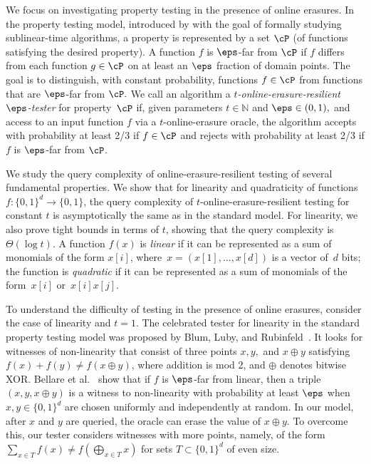 \documentclass{toc}
\begin{document}
We focus on investigating property testing in the presence of online erasures. In the property testing model, introduced by \cite{RubinfeldS96,GGR98} with the goal of formally studying sublinear-time algorithms, a property is represented by a set  $\cP$ (of functions satisfying the desired property).  A function $f$ is $\eps$-far from $\cP$ if $f$ differs from each function $g\in\cP$ on at least an $\eps$ fraction of domain points. 
The goal is to distinguish, with constant probability, functions $f\in\cP$ from functions that are $\eps$-far from $\cP.$
We call an algorithm a {\em $t$-online-erasure-resilient $\eps$-tester} for property~$\cP$ if, given parameters $t\in\mathbb{N}$ and $\eps\in(0,1),$ and access to an input function $f$ via a $t$-online-erasure oracle, the algorithm accepts with probability at least 2/3 if $f\in\cP$ and rejects with probability at least 2/3 if $f$ is $\eps$-far from $\cP$.

We study the query complexity of online-erasure-resilient testing of several fundamental properties. 
We show that for linearity and quadraticity of functions $f:\{0,1\}^d\to\{0,1\}$, the query complexity of $t$-online-erasure-resilient testing for constant $t$ is asymptotically the same as in the standard model. For linearity, we also prove tight bounds in terms of $t$, showing that the query complexity is $\Theta(\log t)$.
A function $f(x)$ is {\em linear} if it can be represented as a sum of monomials of the form $x[i]$, where~$x=(x[1],\dots,x[d])$ is a vector of~$d$ bits; the function is {\em quadratic} if it can be represented as a sum of monomials of the form~$x[i]$ or~$x[i]x[j]$.



To understand
the difficulty of testing in the presence of online erasures, consider the case of linearity and $t=1.$ The celebrated tester for linearity in the standard property testing model was proposed by
Blum, Luby, and Rubinfeld~\cite{BlumLR93}. It looks for witnesses of non-linearity that consist of three points $x,y,$ and $x\oplus y$ satisfying $f(x)+f(y)\neq f(x\oplus y)$, where addition is mod 2, and $\oplus$ denotes bitwise XOR. 
Bellare et al.~\cite{BellareCHKS96} show that if $f$ is $\eps$-far from linear, then a triple $(x,y, x\oplus y)$ is a witness to non-linearity with probability at least $\eps$ when $x,y\in\{0,1\}^d$ are chosen uniformly and independently at random. 
In our model, after $x$ and $y$ are queried, the oracle can erase the value of $x\oplus y.$ 
To overcome this, our tester considers witnesses with more points, namely, of the form $\sum_{x\in T}f(x) \neq f(\bigoplus_{x \in T}{x})$ for sets $T \subset \{0,1\}^d$ of even size.
\end{document}
